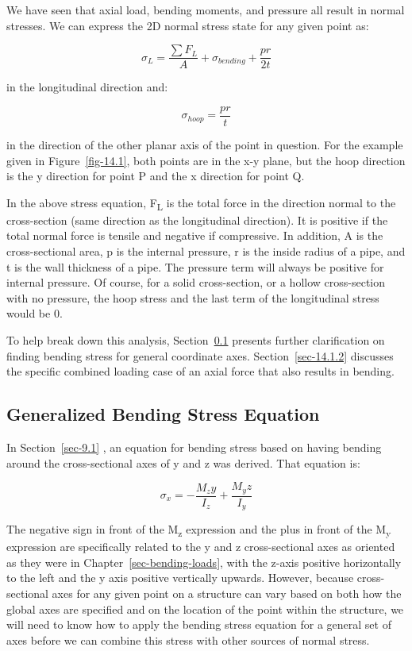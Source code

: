 \documentclass[
  letterpaper,
  DIV=11,
  numbers=noendperiod]{scrreprt}
\theoremstyle{definition}
\theoremstyle{remark}
\begin{document}
We have seen that axial load, bending moments, and pressure all result
in normal stresses. We can express the 2D normal stress state for any
given point as:

\[
\sigma_L=\frac{\sum F_L}{A}+\sigma_{bending}+\frac{p r}{2 t}
\]

in the longitudinal direction and:

\[
\sigma_{hoop}=\frac{p r}{t}
\]

in the direction of the other planar axis of the point in question. For
the example given in Figure~\ref{fig-14.1}, both points are in the x-y
plane, but the hoop direction is the y direction for point P and the x
direction for point Q.

In the above stress equation, F\textsubscript{L} is the total force in
the direction normal to the cross-section (same direction as the
longitudinal direction). It is positive if the total normal force is
tensile and negative if compressive. In addition, A is the
cross-sectional area, p is the internal pressure, r is the inside radius
of a pipe, and t is the wall thickness of a pipe. The pressure term will
always be positive for internal pressure. Of course, for a solid
cross-section, or a hollow cross-section with no pressure, the hoop
stress and the last term of the longitudinal stress would be 0.

To help break down this analysis, Section~\ref{sec-14.1.1} presents
further clarification on finding bending stress for general coordinate
axes. Section~\ref{sec-14.1.2} discusses the specific combined loading
case of an axial force that also results in bending.

\subsection{Generalized Bending Stress Equation}\label{sec-14.1.1}

In Section~\ref{sec-9.1} , an equation for bending stress based on
having bending around the cross-sectional axes of y and z was derived.
That equation is:

\[
\sigma_x=-\frac{M_z y}{I_z}+\frac{M_y z}{I_y}
\]

The negative sign in front of the M\textsubscript{z} expression and the
plus in front of the M\textsubscript{y} expression are specifically
related to the y and z cross-sectional axes as oriented as they were in
Chapter~\ref{sec-bending-loads}, with the z-axis positive horizontally
to the left and the y axis positive vertically upwards. However, because
cross-sectional axes for any given point on a structure can vary based
on both how the global axes are specified and on the location of the
point within the structure, we will need to know how to apply the
bending stress equation for a general set of axes before we can combine
this stress with other sources of normal stress.
\end{document}

